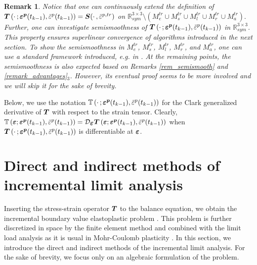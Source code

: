 \documentclass[a4paper,12pt]{article}
\newtheorem{remark}{Remark}[section]
\theoremstyle{remark}
\newcommand{\mbf}[1]{\mbox{\boldmath$#1$}}
\numberwithin{equation}{section}
\begin{document}
\begin{remark}
\emph{Notice that one can continuously extend the definition of $\mbf T\left(\cdot\,;\mbf{\varepsilon^p}(t_{k-1}),\bar{\varepsilon}^p(t_{k-1})\right)=\mbf S(\cdot\,,\bar\varepsilon^{p,tr})$ on $\mathbb R^{3\times 3}_{sym}\setminus (M^{tr}_{e}\cup M^{tr}_{s}\cup M^{tr}_{l}\cup M^{tr}_{r}\cup M^{tr}_{a}).$  Further, one can investigate semismoothness of $\mbf T\left(\cdot\,;\mbf{\varepsilon^p}(t_{k-1}),\bar{\varepsilon}^p(t_{k-1})\right)$  in $\mathbb R^{3\times 3}_{sym}$. This property ensures superlinear convergence of algorithms introduced in the next section. To show the semismoothness in $M^{tr}_{e}$, $M^{tr}_{s}$, $M^{tr}_{l}$, $M^{tr}_{r}$, and $M^{tr}_{a}$, one can use a standard framework introduced, e.g. in \cite{ GrVa09, SaWi11, Sy09,CKSV14, Sy14,SCKKZB15}.  At the remaining points, the semismoothness is also expected based on Remarks \ref{rem_semismooth} and \ref{remark_advantages}$_3$. However, its eventual proof seems to be more involved and we will skip it for the sake of brevity.} 
\end{remark}

Below, we use the notation $\mathbb T\left(\cdot\,;\mbf{\varepsilon^p}(t_{k-1}),\bar{\varepsilon}^p(t_{k-1})\right)$ for the Clark generalized derivative of $\mbf T$ with respect to the strain tensor. Clearly, $\mathbb T\left(\mbf{\varepsilon};\mbf{\varepsilon^p}(t_{k-1}),\bar{\varepsilon}^p(t_{k-1})\right)=\mathcal D_{\mbf\varepsilon}\mbf T\left(\mbf{\varepsilon};\mbf{\varepsilon^p}(t_{k-1}),\bar{\varepsilon}^p(t_{k-1})\right)$ when $\mbf T\left(\cdot\,;\mbf{\varepsilon^p}(t_{k-1}),\bar{\varepsilon}^p(t_{k-1})\right)$ is differentiable at $\mbf{\varepsilon}$.




\section{Direct and indirect methods of incremental limit analysis}
\label{sec_realization}


Inserting the stress-strain operator $\mbf T$ to the balance equation, we obtain the incremental boundary value elastoplastic problem \cite{NPO08,SCKKZB15}. This problem is further discretized in space by the finite element method and combined with the limit load analysis as it is usual in Mohr-Coulomb plasticity \cite{NPO08, CL90} . In this section, we introduce the direct and indirect methods of the incremental limit analysis. For the sake of brevity, we focus only on an algebraic formulation of the problem. 
\end{document}
